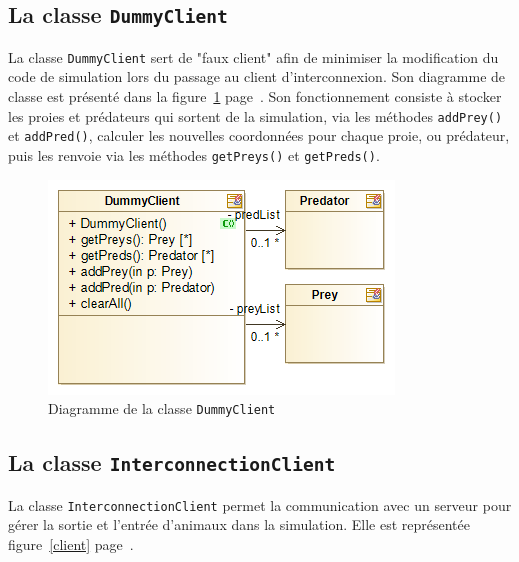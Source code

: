 \documentclass[12pt,a4paper,titlepage]{article}
\begin{document}
\subsection{La classe \texttt{DummyClient}}
\FloatBarrier
La classe \texttt{DummyClient} sert de "faux client" afin de minimiser la modification du code de simulation lors du passage au client d'interconnexion.
Son diagramme de classe est présenté dans la figure~\ref{dummy} page~\pageref{dummy}. Son fonctionnement consiste à stocker les proies et prédateurs qui sortent de la simulation, via les méthodes \texttt{addPrey()} et \texttt{addPred()}, calculer les nouvelles coordonnées pour chaque proie, ou prédateur, puis les renvoie via les méthodes \texttt{getPreys()} et \texttt{getPreds()}.
\begin{figure}[h]
\includegraphics[width = \textwidth]{"../diagrammes/dummy"}
\caption{Diagramme de la classe \texttt{DummyClient}}
\label{dummy}
\end{figure}
\FloatBarrier
\subsection{La classe \texttt{InterconnectionClient}}
\FloatBarrier
La classe \texttt{InterconnectionClient} permet la communication avec un serveur pour gérer la sortie et l'entrée d'animaux dans la simulation. Elle est représentée figure~\ref{client} page~\pageref{client}.
\end{document}
